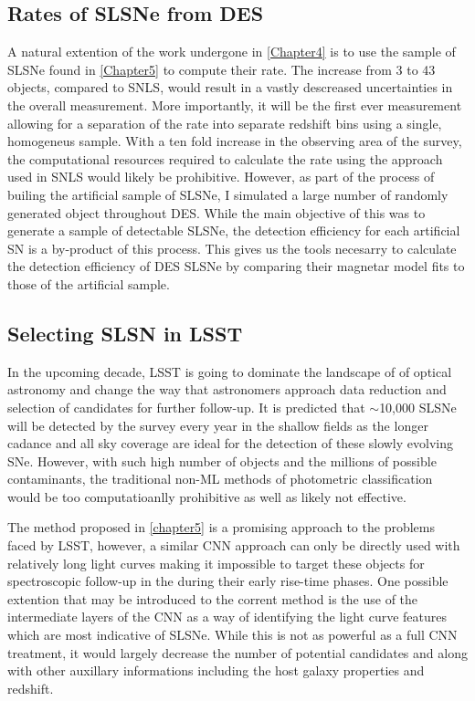 \subsection{Rates of SLSNe from DES}
A natural extention of the work undergone in \cref{Chapter4} is to use the sample of SLSNe found in \cref{Chapter5} to compute their rate. The increase from 3 to 43 objects, compared to SNLS, would result in a vastly descreased uncertainties in the overall measurement. More importantly, it will be the first ever measurement allowing for a separation of the rate into separate redshift bins using a single, homogeneus sample. With a ten fold increase in the observing area of the survey, the computational resources required to calculate the rate using the approach used in SNLS would likely be prohibitive. However, as part of the process of builing the artificial sample of SLSNe, I simulated a large number of randomly generated object throughout DES. While the main objective of this was to generate a sample of detectable SLSNe, the detection efficiency for each artificial SN is a by-product of this process. This gives us the tools necesarry to calculate the detection efficiency of DES SLSNe by comparing their magnetar model fits to those of the artificial sample.

\subsection{Selecting SLSN in LSST}
In the upcoming decade, LSST is going to dominate the landscape of of optical astronomy and change the way that astronomers approach data reduction and selection of candidates for further follow-up. It is predicted that $\sim$10,000 SLSNe will be detected by the survey every year in the shallow fields as the longer cadance and all sky coverage are ideal for the detection of these slowly evolving SNe. However, with such high number of objects and the millions of possible contaminants, the traditional non-ML methods of photometric classification would be too computatioanlly prohibitive as well as likely not effective.

The method proposed in \cref{chapter5} is a promising approach to the problems faced by LSST, however, a similar CNN approach can only be directly used with relatively long light curves making it impossible to target these objects for spectroscopic follow-up in the during their early rise-time phases. One possible extention that may be introduced to the corrent method is the use of the intermediate layers of the CNN as a way of identifying the light curve features which are most indicative of SLSNe. While this is not as powerful as a full CNN treatment, it would largely decrease the number of potential candidates and along with other auxillary informations including the host galaxy properties and redshift.

